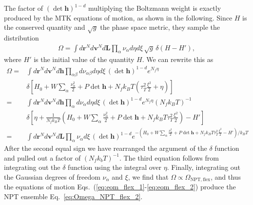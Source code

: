 \documentclass[12pt,letter]{article}
\renewcommand{\vec}[1]{\mathbf{#1}}
\begin{document}
The factor of $(\det\vec h)^{1-d}$ multiplying the Boltzmann weight is exactly produced by the MTK
equations of motion, as shown in the following. Since $H$ is the conserved quantity and $\sqrt{g}$ the phase space metric, they sample the distribution
\begin{align}
\Omega = \int d\vec r^N d\vec v^N d\vec L \prod_\alpha \nu_\alpha d\eta
d\xi\, \sqrt{g}\, \delta(H - H'),
\end{align}
where $H'$ is the initial value of the quantity $H$.
We can rewrite this as
\begin{align}
\Omega =& \int d\vec r^N d\vec v^N d\vec h \prod_{\alpha\beta} d\nu_{\alpha\beta} d\eta
d\xi\, (\det\vec h)^{1-d} e^{N_f \eta}\\
& \delta\left[H_0 +  W \sum_\alpha \frac{\nu_\alpha^2}{2} + P\det \vec h + N_f k_B T \left(\tau_T^2 \frac{\xi^2}{2} + \eta\right)\right]
\label{eq:Omega_eom_ortho_1}\\
=&\int d\vec r^N d\vec v^N d\vec h \prod_\alpha d\nu_\alpha d\eta
d\xi\, (\det \vec h)^{1-d} e^{N_f \eta} (N_f k_B T)^{-1}\\
& \delta\left[\eta + \frac{1}{N_f k_B T}\left(H_0 +  W \sum_\alpha \frac{\nu_\alpha^2}{2} + P \det \vec h + N_f k_B T \tau_T^2 \frac{\xi^2}{2}\right)-H'\right]\\
=&\int d\vec r^N d\vec v^N d\vec L \prod_\alpha \nu_\alpha
d\xi\, (\det\vec h)^{1-d} e^{-\left(H_0 +  W \sum_\alpha \frac{\nu_\alpha^2}{2} + P \det\vec h+ N_f k_B T \tau_T^2 \frac{\xi^2}{2} - H'\right)/k_B T}\label{eq:Omega_NPT_flex_3}
\end{align}
After the second equal sign we have rearranged the argument of the $\delta$ function and pulled
out a factor of $(N_f k_b T)^{-1}$. The third equation follows from integrating out the $\delta$ function
using the integral over $\eta$. Finally, integrating out the Gaussian degrees of freedom $\nu_\alpha$ and $\xi$, we find that $\Omega \propto \Omega_{\mathrm{NPT,flex}}$, and thus the equations
of motion Eqs.~(\ref{eq:eom_flex_1}-\ref{eq:eom_flex_2}) 
produce the NPT ensemble Eq.~\eqref{eq:Omega_NPT_flex_2}.
\end{document}
